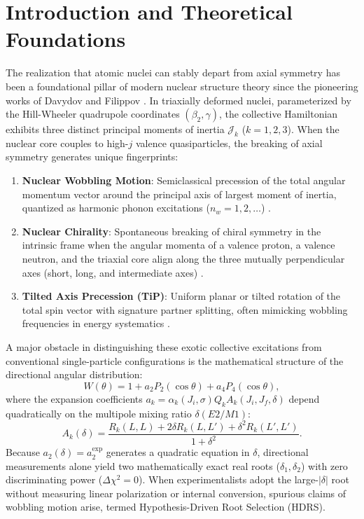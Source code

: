 \documentclass[aps,prc,twocolumn,showpacs,superscriptaddress,floatfix,nofootinbib]{revtex4-2}
\begin{document}
\maketitle

\section{Introduction and Theoretical Foundations}
\label{sec:intro}

The realization that atomic nuclei can stably depart from axial symmetry has been a foundational pillar of modern nuclear structure theory since the pioneering works of Davydov and Filippov \cite{BohrMottelson1975,GreinerMaruhn1996}. In triaxially deformed nuclei, parameterized by the Hill-Wheeler quadrupole coordinates $(\beta_2, \gamma)$, the collective Hamiltonian exhibits three distinct principal moments of inertia $\mathcal{J}_k$ ($k=1,2,3$). When the nuclear core couples to high-$j$ valence quasiparticles, the breaking of axial symmetry generates unique fingerprints:
\begin{enumerate}
    \item \textbf{Nuclear Wobbling Motion}: Semiclassical precession of the total angular momentum vector around the principal axis of largest moment of inertia, quantized as harmonic phonon excitations ($n_w = 1, 2, \dots$) \cite{BohrMottelson1975}.
    \item \textbf{Nuclear Chirality}: Spontaneous breaking of chiral symmetry in the intrinsic frame when the angular momenta of a valence proton, a valence neutron, and the triaxial core align along the three mutually perpendicular axes (short, long, and intermediate axes) \cite{Frauendorf1997,Starosta2001}.
    \item \textbf{Tilted Axis Precession (TiP)}: Uniform planar or tilted rotation of the total spin vector with signature partner splitting, often mimicking wobbling frequencies in energy systematics \cite{Lv2022}.
\end{enumerate}

A major obstacle in distinguishing these exotic collective excitations from conventional single-particle configurations is the mathematical structure of the directional angular distribution:
\begin{equation}
    W(\theta) = 1 + a_2 P_2(\cos\theta) + a_4 P_4(\cos\theta),
    \label{eq:w_theta}
\end{equation}
where the expansion coefficients $a_k = \alpha_k(J_i, \sigma) Q_k A_k(J_i, J_f, \delta)$ depend quadratically on the multipole mixing ratio $\delta(E2/M1)$:
\begin{equation}
    A_k(\delta) = \frac{R_k(L, L) + 2 \delta R_k(L, L') + \delta^2 R_k(L', L')}{1 + \delta^2}.
    \label{eq:ak_delta}
\end{equation}
Because $a_2(\delta) = a_2^{\text{exp}}$ generates a quadratic equation in $\delta$, directional measurements alone yield two mathematically exact real roots ($\delta_1, \delta_2$) with zero discriminating power ($\Delta\chi^2 = 0$). When experimentalists adopt the large-$|\delta|$ root without measuring linear polarization or internal conversion, spurious claims of wobbling motion arise, termed Hypothesis-Driven Root Selection (HDRS).
\end{document}
